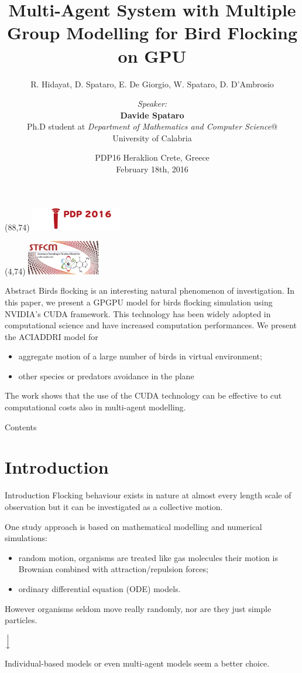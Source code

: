 \documentclass{beamer}
\title[The ACIADDRI model]{Multi-Agent System with Multiple Group Modelling
for Bird Flocking on GPU}
\subtitle{ R. Hidayat, D. Spataro, E. De Giorgio, W. Spataro, D. D'Ambrosio  }
\author[R. Hidayat, D. Spataro, E. De Giorgio, W. Spataro, D. D'Ambrosio] 
{\textit{Speaker:} \hfill \\ \textbf{ Davide Spataro} \\
Ph.D student at \textit{Department of Mathematics and Computer Science}@\\
   University of Calabria
}
\date{PDP16  Heraklion Crete, Greece \\
February 18th, 2016}
\newcommand{\MyLogo}{%
\begin{textblock}{13}(88,74)
 \includegraphics[height=1cm, angle=0]{images/pdp2016}
\end{textblock}
}
\newcommand{\MyLogoo}{%
\begin{textblock}{15}(4,74)
 \includegraphics[height=1.5cm, angle=0]{images/logo1}
\end{textblock}
}
\begin{document}
\begin{frame}
\MyLogo
\MyLogoo
\titlepage
\end{frame}

\begin{frame}{Abstract}
Birds flocking is an interesting natural phenomenon of investigation. In this paper, we present a GPGPU model for birds flocking simulation using NVIDIA's CUDA framework. This technology has been widely adopted
in computational science and have  increased computation performances. We present the ACIADDRI model for 
\begin{itemize}
\item aggregate motion of a large
number of birds in virtual environment;
\item other species or predators avoidance in the plane
\end{itemize} 

The work shows that the use of the CUDA technology can be effective to cut computational costs also in multi-agent modelling.
\end{frame}

\begin{frame}{Contents}
\tableofcontents
\end{frame}

\section{Introduction}
\begin{frame}{Introduction}
 Flocking behaviour exists in nature at almost every length scale of observation but it can be investigated as a collective motion. 

One study approach is based on mathematical modelling and numerical simulations:
\begin{itemize}
\item random motion, organisms are treated like gas molecules their motion is Brownian combined with attraction/repulsion forces;
\item ordinary differential equation (ODE) models.
\end{itemize}
However organisms seldom move really randomly, nor are they just
simple particles. 
\begin{center}
$\Big{\downarrow}$ 
\end{center}

Individual-based models or even multi-agent models seem a
better choice.  
\end{frame}
\end{document}
